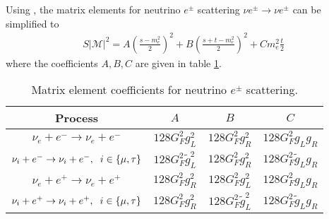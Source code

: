 Using , the matrix elements for neutrino $e^\pm$ scattering $\nu e^\pm\rightarrow \nu e^\pm$ can be simplified to
\begin{align}
S|\mathcal{M}|^2=A\left(\frac{s-m_e^2}{2}\right)^2+B\left(\frac{s+t-m_e^2}{2}\right)^2+Cm_e^2\frac{t}{2}
\end{align}
 where the coefficients $A,B,C$ are given in table \ref{table:nu:e:coeff}.

\begin{table}[ht]
\centering 
\begin{tabular}{|c|c|c|c|}
\hline
Process &$A$&$B$&$C$  \\
\hline
$\nu_e+e^-\rightarrow \nu_e+e^-$&$128G_F^2g_L^2$&$128G_F^2g_R^2$&$128G_F^2g_Lg_R$\\
\hline
$\nu_i+e^-\rightarrow \nu_i+e^-,\hspace{2mm} i\in\{\mu,\tau\}$&$128G_F^2\tilde g_L^2$&$128G_F^2g_R^2$&$128G_F^2\tilde g_Lg_R$\\
\hline
$\nu_e+e^+\rightarrow \nu_e+e^+$&$128G_F^2g_R^2$&$128G_F^2g_L^2$&$128G_F^2g_Lg_R$\\
\hline
$\nu_i+e^+\rightarrow \nu_i+e^+,\hspace{2mm} i\in\{\mu,\tau\}$&$128G_F^2 g_R^2$&$128G_F^2\tilde g_L^2$&$128G_F^2\tilde g_Lg_R$\\
\hline
\end{tabular}
\caption{Matrix element coefficients for neutrino $e^\pm$ scattering.}
\label{table:nu:e:coeff}
\end{table}



